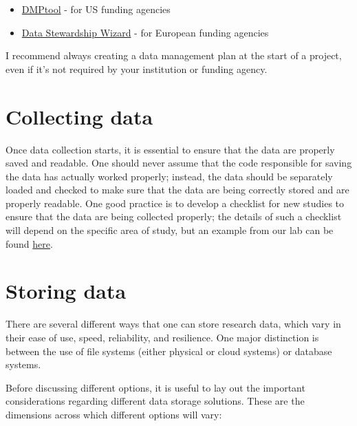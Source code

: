 \begin{itemize}
\item \href{https://dmptool.org/}{DMPtool} - for US funding agencies
\item \href{https://ds-wizard.org/}{Data Stewardship Wizard} - for European funding agencies
\end{itemize}

I recommend always creating a data management plan at the start of a project, even if it's not required by your institution or funding agency.

\section{Collecting data}

Once data collection starts, it is essential to ensure that the data are properly saved and readable.  One should never assume that the code responsible for saving the data has actually worked properly; instead, the data should be separately loaded and checked to make sure that the data are being correctly stored and are properly readable. One good practice is to develop a checklist for new studies to ensure that the data are being collected properly; the details of such a checklist will depend on the specific area of study, but an example from our lab can be found \href{https://www.poldracklab.org/labguide/research/EXDAR\_template.pdf}{here}.

\section{Storing data}

There are several different ways that one can store research data, which vary in their ease of use, speed, reliability, and resilience.  One major distinction is between the use of file systems (either physical or cloud systems) or database systems.

Before discussing different options, it is useful to lay out the important considerations regarding different data storage solutions.  These are the dimensions across which different options will vary:

